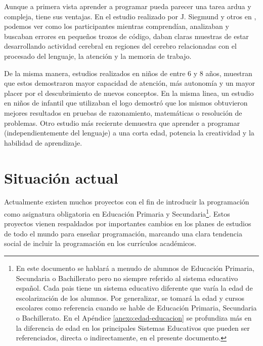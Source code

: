 Aunque a primera vista aprender a programar pueda parecer una tarea ardua y compleja, tiene sus ventajas. En el estudio realizado por J. Siegmund y otros en \cite{siegmund2014understanding}, podemos ver como los participantes mientras comprendían, analizaban y buscaban errores en pequeños trozos de código, daban claras muestras de estar desarrollando actividad cerebral en regiones del cerebro relacionadas con el procesado del lenguaje, la atención y la memoria de trabajo.

De la misma manera, estudios realizados en niños \cite{clements1986effects} de entre 6 y 8 años, muestran que estos demostraron mayor capacidad de atención, más autonomía y un mayor placer por el descubrimiento de nuevos conceptos. En la misma linea, un estudio en niños de infantil \cite{logo-geometry} que utilizaban el \Gls{logo} demostró que los mismos obtuvieron mejores resultados en pruebas de razonamiento, matemáticas o resolución de problemas. Otro estudio más reciernte \cite{liao1991effects} demuestra que aprender a programar (independientemente del lenguaje) a una corta edad, potencia la creatividad y la habilidad de aprendizaje.



\section{Situación actual}
\label{sec:situacion-actual}


Actualmente existen muchos proyectos con el fin de introducir la programación como asignatura obligatoria en Educación Primaria y Secundaria\footnote{{\color{red}En este documento se hablará a menudo de alumnos de Educación Primaria, Secundaria o Bachillerato pero no siempre referido al sistema educativo español. Cada pais tiene un sistema educativo diferente que varía la edad de escolarización de los alumnos. Por generalizar, se tomará la edad y cursos escolares como referencia cuando se hable de Educación Primaria, Secundaria o Bachillerato. En el Apéndice \ref{anexo:edad-educacion} se profundiza más en la diferencia de edad en los principales Sistemas Educativos que pueden ser referenciados, directa o indirectamente, en el presente documento}.}. Estos proyectos vienen respaldados por importantes cambios en los planes de estudios de todo el mundo para enseñar programación\cite{cs-education,madrid-programacion,codigo21, guide-england-computing,chicago-cs}, marcando una clara tendencia social de incluir la programación en los currículos académicos.



